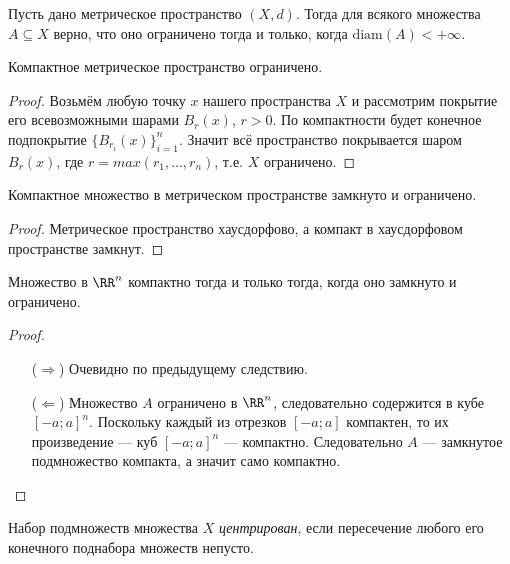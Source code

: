 \documentclass[12pt,a4paper]{article}
\newcommand{\diam}{\ensuremath{\mathrm{diam}}\xspace}
\begin{document}
    \begin{lemma}
        Пусть дано метрическое пространство $(X, d)$. Тогда для всякого множества $A \subseteq X$ верно, что оно ограничено тогда и только, когда $\diam(A) < +\infty$.
    \end{lemma}

    \begin{theorem}
        Компактное метрическое пространство ограничено.
    \end{theorem}

    \begin{proof}
        Возьмём любую точку $x$ нашего пространства $X$ и рассмотрим покрытие его всевозможными шарами $B_r(x)$, $r > 0$. По компактности будет конечное подпокрытие $\{B_{r_i}(x)\}_{i=1}^n$. Значит всё пространство покрывается шаром $B_r(x)$, где $r = max(r_1, \dots, r_n)$, т.е. $X$ ограничено.
    \end{proof}

    \begin{corollary}
        Компактное множество в метрическом пространстве замкнуто и ограничено.
    \end{corollary}

    \begin{proof}
        Метрическое пространство хаусдорфово, а компакт в хаусдорфовом пространстве замкнут.
    \end{proof}

    \begin{theorem}
        Множество в $\RR^n$ компактно тогда и только тогда, когда оно замкнуто и ограничено.
    \end{theorem}

    \begin{proof}\ 
        \begin{itemize}
            \item[($\Rightarrow$)] Очевидно по предыдущему следствию.
            \item[($\Leftarrow$)] Множество $A$ ограничено в $\RR^n$, следовательно содержится в кубе $[-a; a]^n$. Поскольку каждый из отрезков $[-a; a]$ компактен, то их произведение --- куб $[-a; a]^n$ --- компактно. Следовательно $A$ --- замкнутое подмножество компакта, а значит само компактно.
        \end{itemize}
    \end{proof}

    \begin{definition}\label{finite-intersection-property-definition}
        Набор подмножеств множества $X$ \emph{центрирован}, если пересечение любого его конечного поднабора множеств непусто.
    \end{definition}
\end{document}
